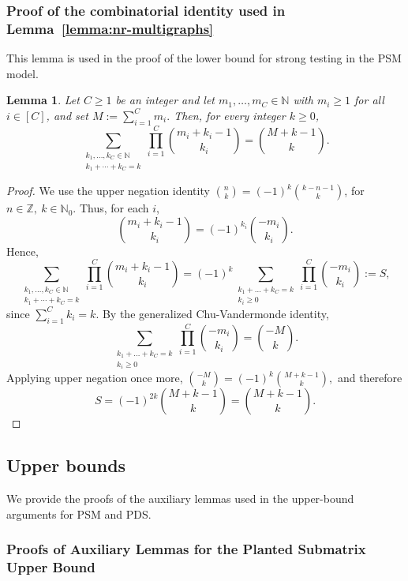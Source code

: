 \documentclass[11pt, letterpaper]{article}
\newtheorem{lemma}[theorem]{Lemma}
\numberwithin{equation}{section}
\begin{document}
\subsubsection{Proof of the combinatorial identity used in Lemma~\ref{lemma:nr-multigraphs}}\label{app:pf-lemma-combinatorial}

This lemma is used in the proof of the lower bound for strong testing in the PSM model.

\begin{lemma}\label{lem:combinatorial_bound}
Let $C\geq 1$ be an integer and let $m_1,\dots,m_C\in\mathbb{N}$ with $m_i\geq 1$ for all $i\in[C]$, and set $M:=\sum_{i=1}^C m_i.$
Then, for every integer $k\geq 0$,
\[
\sum_{\substack{k_1,\dots,k_C\in\mathbb{N}\\ k_1+\cdots+k_C=k}}
\prod_{i=1}^C
\binom{m_i+k_i-1}{k_i}
=
\binom{M+k-1}{k}.
\]
\end{lemma}

\begin{proof}
We use the upper negation identity
$\binom{n}{k}=(-1)^k\binom{k-n-1}{k}$, for $n\in\mathbb Z,\ k\in\mathbb N_0.$
Thus, for each $i$,
\[
\binom{m_i+k_i-1}{k_i}=(-1)^{k_i}\binom{-m_i}{k_i}.
\]
Hence,
\[\sum_{\substack{k_1,\dots,k_C\in\mathbb{N}\\ k_1+\cdots+k_C=k}}
\prod_{i=1}^C
\binom{m_i+k_i-1}{k_i}=(-1)^k\sum_{\substack{k_1+\ldots+k_C=k\\ k_i \ge 0}}\prod_{i=1}^C \binom{-m_i}{k_i}:=S,\]
since $\sum_{i=1}^C k_i=k$. By the generalized Chu-Vandermonde identity,
\[\sum_{\substack{k_1+\ldots+k_C=k\\ k_i \ge 0}}\prod_{i=1}^C \binom{-m_i}{k_i}=\binom{-M}{k}.\]
Applying upper negation once more, 
$\binom{-M}{k}=(-1)^k\binom{M+k-1}{k},$
and therefore 
\[S=(-1)^{2k}\binom{M+k-1}{k}=\binom{M+k-1}{k}.
\]
\end{proof}

\subsection{Upper bounds}\label{app:pf:technical-lemmas-second-moment-psm}
We provide the proofs of the auxiliary lemmas used in the upper-bound arguments for PSM
and PDS.
\subsubsection*{Proofs of Auxiliary Lemmas for the Planted Submatrix Upper Bound}
\end{document}
